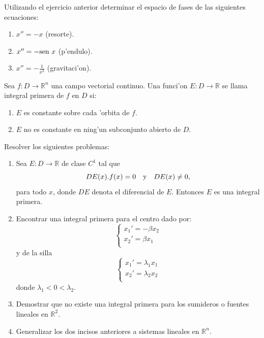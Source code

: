 \begin{ejercicio}{} Utilizando el ejercicio anterior determinar el
espacio de fases de las siguientes ecuaciones:
\begin{enumerate}
\item $x''=-x$ (resorte).
\item $x''=-\hbox{sen } x$ (p'endulo).
\item $x''=-\frac{1}{x^2}$ (gravitaci'on).
\end{enumerate}
\end{ejercicio}





\begin{ejercicio}{} Sea $f:D\to\mathbb{R}^n$ una campo vectorial
continuo. Una funci'on $E:D\to\mathbb{R}$ se llama integral
primera de $f$ en $D$ si:
\begin{enumerate}
\item $E$ es constante sobre cada 'orbita de $f$.
\item $E$ no es constante en ning'un subconjunto abierto de $D$.

\end{enumerate}
Resolver los siguientes problemas:
\begin{enumerate}
\item Sea $E:D\to\mathbb{R}$  de clase
$C^1$  tal que
\[
    DE(x).f(x)=0\quad\hbox{y}\quad DE(x)\neq 0,
\]
para todo $x$, donde $DE$ denota el diferencial de $E$. Entonces
$E$ es una integral primera.
\item Encontrar una integral primera para el centro dado por:
\[
    \left\{%
\begin{array}{ll}
   x_1'=-\beta x_2 \\
    x_2'=\beta x_1 \\
\end{array}%
\right.
\]
y de la silla
\[
    \left\{%
\begin{array}{ll}
   x_1'=\lambda_1 x_1 \\
    x_2'=\lambda_2 x_2 \\
\end{array}%
\right.
\]
donde $\lambda_1<0<\lambda_2$.

\item Demostrar que no existe una integral primera para los
sumideros o fuentes lineales en $\mathbb{R}^2$.

\item Generalizar los dos incisos anteriores a
sistemas lineales en $\mathbb{R}^n$.


\end{enumerate}
\end{ejercicio}
